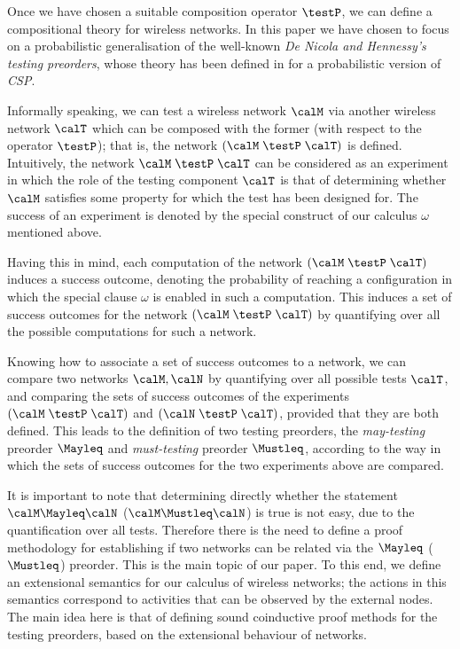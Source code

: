 \documentclass{LMCS}
\begin{document}
Once we have chosen a suitable composition operator $\testP$, 
we can define a compositional theory for wireless networks. 
In this paper we have chosen to focus on a probabilistic generalisation 
of the well-known \emph{De Nicola and Hennessy's testing preorders}, 
whose theory has been defined in \cite{DGHM09full} for a probabilistic 
version of \emph{CSP}.

Informally speaking, we can test a wireless network $\calM$ via 
another wireless network $\calT$ which can be composed 
 with the former (with respect to the operator $\testP$); 
that is, the network $(\calM \;\testP\; \calT)$ is 
defined. Intuitively, the network 
$\calM \;\testP\; \calT$ can be considered as an experiment 
in which the role of the testing component $\calT$ is that of 
determining whether $\calM$ satisfies some property for which 
the test has been designed for. The success of an experiment is 
denoted by the special construct of our calculus $\omega$ mentioned above. 

Having this in mind, each computation of the network 
$(\calM\;\testP\;\calT)$ induces a success outcome, denoting the probability 
of reaching a configuration in which the special clause $\omega$ is enabled 
in such a computation. This induces a set of success outcomes for the network 
$(\calM\;\testP\;\calT)$ by quantifying over all the possible computations for such a network. 

Knowing how to associate a set of success outcomes to a network, we can compare two 
networks $\calM, \calN$ by quantifying over all possible tests $\calT$, and comparing 
the sets of success outcomes of the experiments $(\calM \;\testP\; \calT)$ and 
$(\calN \;\testP\;\calT)$, provided that they are both defined. This leads to 
the definition of two testing preorders, the \emph{may-testing} preorder $\Mayleq$ 
and \emph{must-testing} preorder $\Mustleq$, according to the way in which the sets 
of success outcomes for the two experiments above are compared. 

It is important to note that determining directly whether the statement  
$\calM \Mayleq \calN$ ($\calM \Mustleq \calN$) 
is true is not easy, due to the quantification over all tests. 
Therefore there is the need to define a proof methodology for establishing 
if two networks can be related via the $\Mayleq$ ($\Mustleq$) preorder. 
This is the main topic of our paper. 
To this end, we define an extensional 
semantics for our calculus of wireless networks; the actions in 
this semantics correspond to activities that can be observed 
by the external nodes. The main idea here is that of defining 
sound coinductive proof methods for the testing preorders, 
based on the extensional behaviour of networks. 
\end{document}
